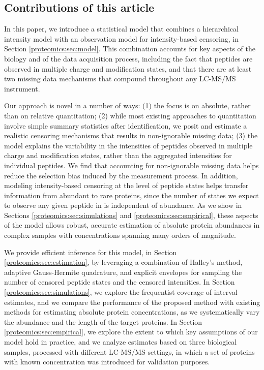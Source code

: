 \subsection{Contributions of this article}

In this paper, we introduce a statistical model that combines a hierarchical intensity model with an observation model for intensity-based censoring, in Section \ref{proteomics:sec:model}.
This combination accounts for key aspects of the biology and of the data acquisition process, including the fact that peptides are observed in multiple charge and modification states, and that there are at least two missing data mechanisms that compound throughout any LC-MS/MS instrument.

Our approach is novel in a number of ways: 
 (1) the focus is on absolute, rather than on relative quantitation;
 (2) while most existing approaches to quantitation involve simple summary statistics after identification, we posit and estimate a realistic censoring mechanisms that results in non-ignorable missing data;
 (3) the model explains the variability in the  intensities of peptides observed in multiple charge and modification states, rather than the aggregated intensities for individual peptides.  
%
We find that accounting for non-ignorable missing data helps reduce the selection bias induced by the measurement process.
In addition, modeling intensity-based censoring at the level of peptide states helps transfer information from abundant to rare proteins, since the number of states we expect to observe any given peptide in is independent of abundance.
As we show in Sections \ref{proteomics:sec:simulations} and \ref{proteomics:sec:empirical}, these aspects of the model allows robust, accurate estimation of absolute protein abundances in complex samples with concentrations spanning many orders of magnitude. 

We provide efficient inference for this model, in Section \ref{proteomics:sec:estimation}, by leveraging a combination of Halley's method, adaptive Gauss-Hermite quadrature, and explicit envelopes for sampling the number of censored peptide states and the censored intensities.
In Section \ref{proteomics:sec:simulations}, we explore the frequentist coverage of interval estimates, and we compare the performance of the proposed method with existing methods for estimating absolute protein concentrations, as we systematically vary the abundance and the length of the target proteins.
In Section \ref{proteomics:sec:empirical}, we explore the extent to which key assumptions of our model hold in practice, and we analyze estimates based on three biological samples, processed with different LC-MS/MS settings, in which a set of proteins with known concentration was introduced for validation purposes.


